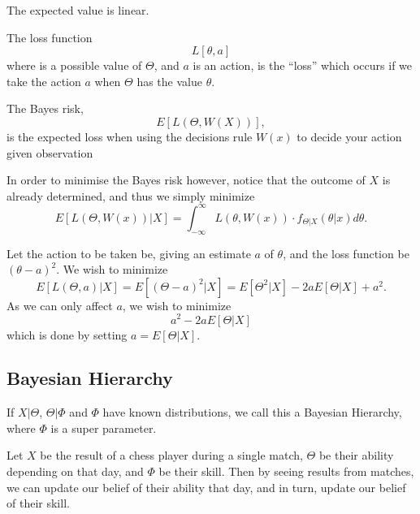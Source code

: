 \begin{obs}
	The expected value is linear.
\end{obs}


\begin{definition}
	The loss function
	\[
		L\left[\theta , a\right]
	\]
	where is a possible value of \(\Theta \), and \(a\) is an action, is the ``loss'' which occurs if we take the action \(a\) when \(\Theta \) has the value \(\theta \).
\end{definition}

\begin{definition}
	The Bayes risk,
	\[
		E\left[L(\Theta, W(X))\right],
	\]
	is the expected loss when using the decisions rule \(W(x)\) to decide your action given observation
\end{definition}

\begin{theorem}
	In order to minimise the Bayes risk however, notice that the outcome of \(X\) is already determined, and thus we simply minimize
	\[
		E\left[L(\Theta, W(x))| X\right] = \int_{- \infty }^{\infty} L(\theta , W(x))  \cdot f _{\Theta | X}(\theta |x) d \theta.
	\]
\end{theorem}

\begin{example}
	Let the action to be taken be, giving an estimate \(a\) of \(\theta\), and the loss function be \((\theta -a)^2\). We wish to minimize
	\[
		E[L(\Theta, a)|X] = E [ (\Theta - a)^2 |X] = E[\Theta ^2|X] -2aE[\Theta |X] + a^2.
	\]
	As we can only affect \(a\), we wish to minimize
	\[
		a^2-2aE[\Theta |X]
	\]
	which is done by setting \(a = E[\Theta |X]\).
\end{example}

\subsection{Bayesian Hierarchy}

\begin{definition}
	If \(X|\Theta \), \(\Theta | \Phi \) and \(\Phi \) have known distributions, we call this a Bayesian Hierarchy, where \(\Phi \) is a super parameter.
\end{definition}

\begin{example}
	Let \(X\) be the result of a chess player during a single match, \(\Theta \) be their ability depending on that day, and \(\Phi \) be their skill. Then by seeing results from matches, we can update our belief of their ability that day, and in turn, update our belief of their skill.
\end{example}

